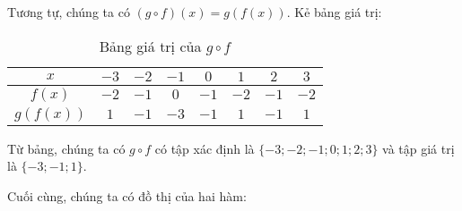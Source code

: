 Tương tự, chúng ta có $\left(g\circ f\right)(x) = g\left(f(x)\right)$. Kẻ bảng giá trị:

\begin{table}[H]
   \centering
   \begin{tabular}{|c|c|c|c|c|c|c|c|}
      \hline
      $x$ & $-3$ & $-2$ & $-1$ & $0$ & $1$ & $2$ & $3$\\
      \hline
      $f(x)$ & $-2$ & $-1$ & $0$ & $-1$ & $-2$ & $-1$ & $-2$\\
      \hline
      $g\left(f(x)\right)$ & $1$ & $-1$ & $-3$ & $-1$ & $1$ & $-1$ & $1$\\
      \hline
   \end{tabular}
   \caption{Bảng giá trị của $g\circ f$}
\end{table}

Từ bảng, chúng ta có $g\circ f$ có tập xác định là $\{-3; -2; -1; 0; 1; 2; 3\}$ và tập giá trị là $\{-3; -1; 1\}$.

Cuối cùng, chúng ta có đồ thị của hai hàm:

